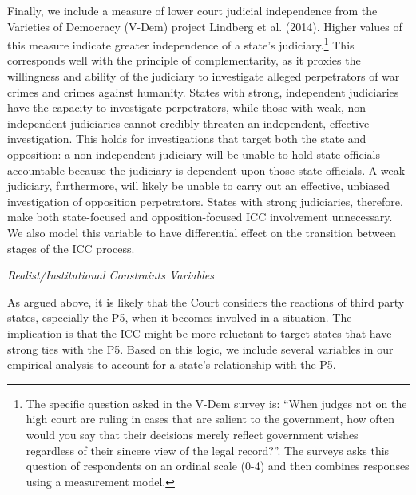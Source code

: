 Finally, we include a measure of lower court judicial independence from the Varieties of Democracy (V-Dem) project Lindberg et al. (2014). Higher values of this measure indicate greater independence of a state's judiciary.\footnote{The specific question asked in the V-Dem survey is: ``When judges not on the high court are ruling in cases that are salient to the government, how often would you say that their decisions merely reflect government wishes regardless of their sincere view of the legal record?''. The surveys asks this question of respondents on an ordinal scale (0-4) and then combines responses using a measurement model.} This corresponds well with the principle of complementarity, as it proxies the willingness and ability of the judiciary to investigate alleged perpetrators of war crimes and crimes against humanity. States with strong, independent judiciaries have the capacity to investigate perpetrators, while those with weak, non-independent judiciaries cannot credibly threaten an independent, effective investigation. This holds for investigations that target both the state and opposition: a non-independent judiciary will be unable to hold state officials accountable because the judiciary is dependent upon those state officials. A weak judiciary, furthermore, will likely be unable to carry out an effective, unbiased investigation of opposition perpetrators. States with strong judiciaries, therefore, make both state-focused and opposition-focused ICC involvement unnecessary. We also model this variable to have differential effect on the transition between stages of the ICC process. %

\emph{Realist/Institutional Constraints Variables}

As argued above, it is likely that the Court considers the reactions of third party states, especially the P5, when it becomes involved in a situation. The implication is that the ICC might be more reluctant to target states that have strong ties with the P5. Based on this logic, we include several variables in our empirical analysis to account for a state's relationship with the P5.


